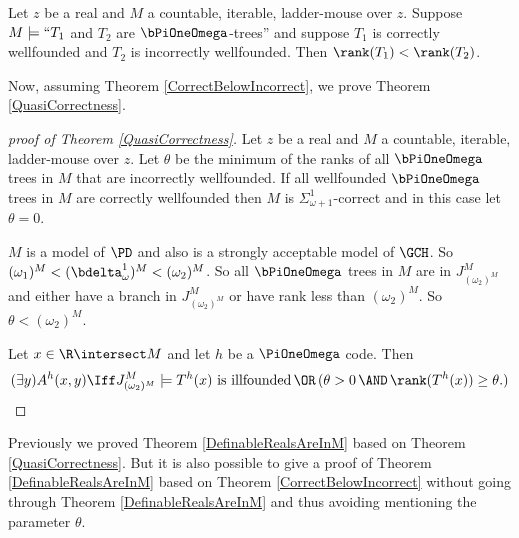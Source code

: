 \documentclass[oneside,12pt]{amsart}
\begin{document}
\begin{theorem}
\label{CorrectBelowIncorrect}
Let $z$ be a real and $M$ a countable, iterable, ladder-mouse over $z$.
Suppose $M\models ``T_1$ and $T_2$ are $\bPiOneOmega$-trees'' and
suppose $T_1$ is correctly wellfounded and
$T_2$ is incorrectly wellfounded. Then $\rank(T_1) < \rank(T_2)$.
\end{theorem}

Now, assuming Theorem \ref{CorrectBelowIncorrect}, we prove Theorem
\ref{QuasiCorrectness}.

\begin{proof}[proof of Theorem \ref{QuasiCorrectness}]
Let $z$ be a real and $M$ a countable, iterable, ladder-mouse over $z$.
Let $\theta$ be the minimum of the ranks of all
$\bPiOneOmega$ trees in $M$ that are  incorrectly wellfounded.
If all wellfounded $\bPiOneOmega$ trees in $M$ are correctly wellfounded
then $M$ is $\Sigma^1_{\omega+1}$-correct and in this case let $\theta=0$.

$M$ is a model of $\PD$ and also is a strongly acceptable model of $\GCH$.
So $(\omega_1)^M<(\bdelta^1_{\omega})^M < (\omega_2)^M$.
So all $\bPiOneOmega$ trees in $M$ are in $J^M_{(\omega_2)^M}$ and either have a branch
in $J^M_{(\omega_2)^M}$ or have rank less than $(\omega_2)^M$.
So $\theta < (\omega_2)^M$.


Let $x\in\R\intersect M$ and let $h$ be a
$\PiOneOmega$ code. Then
$$(\exists y) A^h(x,y) \Iff J^M_{(\omega_2)^M}\models T^h(x) \text{ is illfounded} \,\OR\, (\theta>0 \,\AND\, \rank(T^h(x)) \geq \theta.)$$
\end{proof}

Previously we proved Theorem \ref{DefinableRealsAreInM} based on
Theorem \ref{QuasiCorrectness}. But it is also possible to give a proof
of Theorem \ref{DefinableRealsAreInM} based on Theorem \ref{CorrectBelowIncorrect}
without going through Theorem \ref{DefinableRealsAreInM} and thus avoiding
mentioning the parameter $\theta$.
\end{document}
